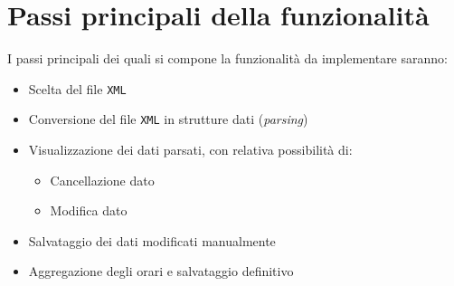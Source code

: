 \section{Passi principali della funzionalità}
I passi principali dei quali si compone la funzionalità da implementare saranno:
\begin{itemize}
	\item Scelta del file \verb|XML|
	\item Conversione del file \verb|XML| in strutture dati (\textit{parsing})
	\item Visualizzazione dei dati parsati, con relativa possibilità di:
		\begin{itemize}
			\item Cancellazione dato
			\item Modifica dato
		\end{itemize}
	\item Salvataggio dei dati modificati manualmente
	\item Aggregazione degli orari e salvataggio definitivo
\end{itemize}